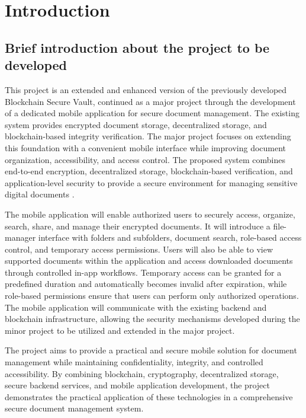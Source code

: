 \documentclass[12pt]{article}
\begin{document}
\newpage
\tableofcontents
\newpage


\newpage
\section{Introduction}

\subsection{Brief introduction about the project to be developed}

This project is an extended and enhanced version of the previously developed Blockchain Secure Vault, continued as a major project through the development of a dedicated mobile application for secure document management. The existing system provides encrypted document storage, decentralized storage, and blockchain-based integrity verification. The major project focuses on extending this foundation with a convenient mobile interface while improving document organization, accessibility, and access control. The proposed system combines end-to-end encryption, decentralized storage, blockchain-based verification, and application-level security to provide a secure environment for managing sensitive digital documents \cite{stallings2017}.

The mobile application will enable authorized users to securely access, organize, search, share, and manage their encrypted documents. It will introduce a file-manager interface with folders and subfolders, document search, role-based access control, and temporary access permissions. Users will also be able to view supported documents within the application and access downloaded documents through controlled in-app workflows. Temporary access can be granted for a predefined duration and automatically becomes invalid after expiration, while role-based permissions ensure that users can perform only authorized operations. The mobile application will communicate with the existing backend and blockchain infrastructure, allowing the security mechanisms developed during the minor project to be utilized and extended in the major project.

The project aims to provide a practical and secure mobile solution for document management while maintaining confidentiality, integrity, and controlled accessibility. By combining blockchain, cryptography, decentralized storage, secure backend services, and mobile application development, the project demonstrates the practical application of these technologies in a comprehensive secure document management system.
\end{document}
